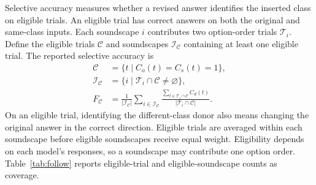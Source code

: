Selective accuracy measures whether a revised answer identifies the inserted
class on eligible trials. An eligible trial has correct answers on both the
original and same-class inputs. Each soundscape $i$ contributes two option-order
trials $\mathcal T_i$. Define the eligible trials $\mathcal C$ and soundscapes
$\mathcal I_{\mathcal C}$ containing at least one eligible trial. The reported
selective accuracy is
\begin{equation}
\begin{aligned}
\mathcal C &= \{t\mid C_o(t)=C_s(t)=1\},\\
\mathcal I_{\mathcal C} &= \{i\mid \mathcal T_i\cap\mathcal C\ne\varnothing\},\\
F_{\mathcal C} &= \frac{1}{|\mathcal I_{\mathcal C}|}
\sum_{i\in\mathcal I_{\mathcal C}}
\frac{\sum_{t\in\mathcal T_i\cap\mathcal C}C_d(t)}
{|\mathcal T_i\cap\mathcal C|}.
\end{aligned}
\label{eq:selective-accuracy}
\end{equation}
On an eligible trial, identifying the different-class donor also means
changing the original answer in the correct direction. Eligible trials are
averaged within each soundscape before eligible soundscapes receive equal
weight. Eligibility depends on each model's responses, so a soundscape may
contribute one option order. Table~\ref{tab:follow} reports eligible-trial and
eligible-soundscape counts as coverage.
